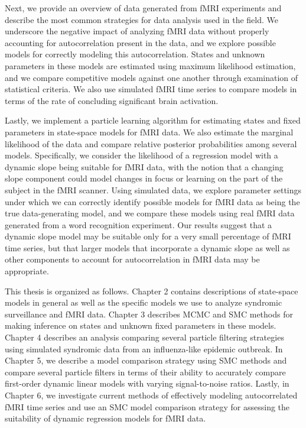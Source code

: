 Next, we provide an overview of data generated from fMRI experiments and describe the most common strategies for data analysis used in the field. We underscore the negative impact of analyzing fMRI data without properly accounting for autocorrelation present in the data, and we explore possible models for correctly modeling this autocorrelation. States and unknown parameters in these models are estimated using maximum likelihood estimation, and we compare competitive models against one another through examination of statistical criteria. We also use simulated fMRI time series to compare models in terms of the rate of concluding significant brain activation.

Lastly, we implement a particle learning algorithm for estimating states and fixed parameters in state-space models for fMRI data. We also estimate the marginal likelihood of the data and compare relative posterior probabilities among several models. Specifically, we consider the likelihood of a regression model with a dynamic slope being suitable for fMRI data, with the notion that a changing slope component could model changes in focus or learning on the part of the subject in the fMRI scanner. Using simulated data, we explore parameter settings under which we can correctly identify possible models for fMRI data as being the true data-generating model, and we compare these models using real fMRI data generated from a word recognition experiment. Our results suggest that a dynamic slope model may be suitable only for a very small percentage of fMRI time series, but that larger models that incorporate a dynamic slope as well as other components to account for autocorrelation in fMRI data may be appropriate.

This thesis is organized as follows. Chapter 2 contains descriptions of state-space models in general as well as the specific models we use to analyze syndromic surveillance and fMRI data. Chapter 3 describes MCMC and SMC methods for making inference on states and unknown fixed parameters in these models. Chapter 4 describes an analysis comparing several particle filtering strategies using simulated syndromic data from an influenza-like epidemic outbreak. In Chapter 5, we describe a model comparison strategy using SMC methods and compare several particle filters in terms of their ability to accurately compare first-order dynamic linear models with varying signal-to-noise ratios. Lastly, in Chapter 6, we investigate current methods of effectively modeling autocorrelated fMRI time series and use an SMC model comparison strategy for assessing the suitability of dynamic regression models for fMRI data. 